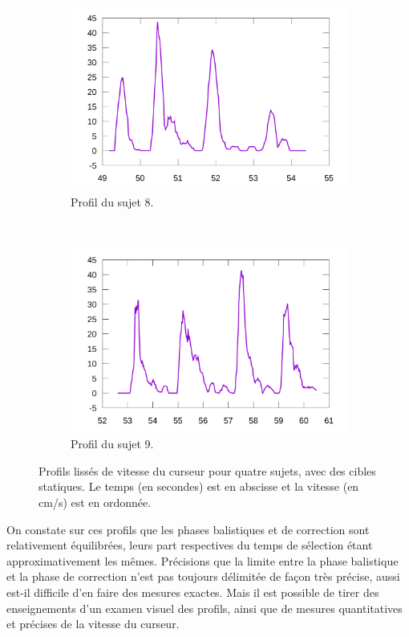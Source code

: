 \begin{figure}[!htb]
\begin{subfigure}[t]{\subImgWlineplot}
			\includegraphics[width=\textwidth]{figures/ch4/subject_08_static_condition_smoothed}
			\caption{Profil du sujet 8.}
			\label{fig:staticProfile8}
		\end{subfigure}
		~
		\begin{subfigure}[t]{\subImgWlineplot}
			\centering
			\includegraphics[width=\textwidth]{figures/ch4/subject_09_static_condition_smoothed}
			\caption{Profil du sujet 9.}
			\label{fig:staticProfile9}
		\end{subfigure}
		\caption[Profils de vitesse du curseur, cibles statiques]{Profils lissés de vitesse du curseur pour quatre sujets, avec des cibles statiques. Le temps (en secondes) est en abscisse et la vitesse (en cm/s) est en ordonnée.}
		\label{fig:staticProfiles}
	\end{figure}
	
	On constate sur ces profils que les phases balistiques et de correction sont relativement équilibrées, leurs part respectives du temps de sélection étant approximativement les mêmes. Précisions que la limite entre la phase balistique et la phase de correction n'est pas toujours délimitée de façon très précise, aussi est-il difficile d'en faire des mesures exactes. Mais il est possible de tirer des enseignements d'un examen visuel des profils, ainsi que de mesures quantitatives et précises de la vitesse du curseur.
	
